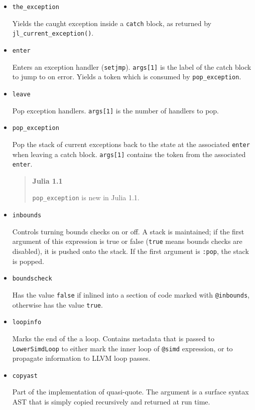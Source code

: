 \begin{itemize}
\item \texttt{the\_exception}

Yields the caught exception inside a \texttt{catch} block, as returned by \texttt{jl\_current\_exception()}.


\item \texttt{enter}

Enters an exception handler (\texttt{setjmp}). \texttt{args[1]} is the label of the catch block to jump to on error.  Yields a token which is consumed by \texttt{pop\_exception}.


\item \texttt{leave}

Pop exception handlers. \texttt{args[1]} is the number of handlers to pop.


\item \texttt{pop\_exception}

Pop the stack of current exceptions back to the state at the associated \texttt{enter} when leaving a catch block. \texttt{args[1]} contains the token from the associated \texttt{enter}.

\begin{quote}
\textbf{Julia 1.1}

\texttt{pop\_exception} is new in Julia 1.1.

\end{quote}

\item \texttt{inbounds}

Controls turning bounds checks on or off. A stack is maintained; if the first argument of this expression is true or false (\texttt{true} means bounds checks are disabled), it is pushed onto the stack. If the first argument is \texttt{:pop}, the stack is popped.


\item \texttt{boundscheck}

Has the value \texttt{false} if inlined into a section of code marked with \texttt{@inbounds}, otherwise has the value \texttt{true}.


\item \texttt{loopinfo}

Marks the end of the a loop. Contains metadata that is passed to \texttt{LowerSimdLoop} to either mark the inner loop of \texttt{@simd} expression, or to propagate information to LLVM loop passes.


\item \texttt{copyast}

Part of the implementation of quasi-quote. The argument is a surface syntax AST that is simply copied recursively and returned at run time.



\end{itemize}
